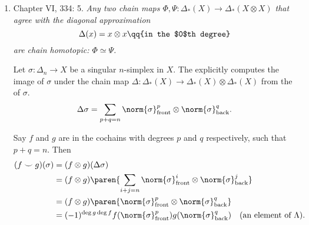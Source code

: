 \documentclass[onesided]{ccg-pset}
\begin{document}
\begin{enumerate}
\item Chapter VI, 334: 5.
\textit{Any two chain maps $\Phi, \Psi \colon \Delta_*(X) \to \Delta_*(X\otimes X)$ that agree with the diagonal approximation
         \[
             \Delta(x) = x \otimes x \qq{in the $0$th degree}
         \]
         are chain homotopic: $\Phi \simeq \Psi$.}

\begin{defn*}
   Let $\sigma \colon \Delta_n \to X$ be a singular $n$-simplex in $X$. The  explicitly computes the image of $\sigma$ under the chain map $\Delta \colon \Delta_*(X) \to \Delta_*(X) \otimes \Delta_*(X)$ from the  of $\sigma$.
   \[
       \Delta \sigma  = \sum_{p + q = n} \norm{ \sigma }_\text{front}^p \otimes \norm{ \sigma }_\text{back}^q
   .\]
\end{defn*}

\begin{prop*}
    Say $f$ and $g$ are in the cochains with degrees $p$ and $q$ respectively, such that $p+q = n$. Then
    \begin{align*}
        (f \smile g)(\sigma) &= (f \otimes g)(\Delta\sigma)\\
                           &= (f \otimes g) \paren{\sum_{i+j = n} \norm{ \sigma }_\text{front}^i \otimes \norm{ \sigma }_\text{back}^j} \\
                           &= (f \otimes g) \paren{ \norm{ \sigma }_\text{front}^p \otimes \norm{ \sigma }_\text{back}^q}  \\
                           & = (-1)^{\deg g \deg f} f(  \norm{ \sigma }_\text{front}^p ) g(\norm{ \sigma }_\text{back}^q) \quad (\text{an element of } \Lambda).
    \end{align*}
\end{prop*}
\end{enumerate}
\end{document}
